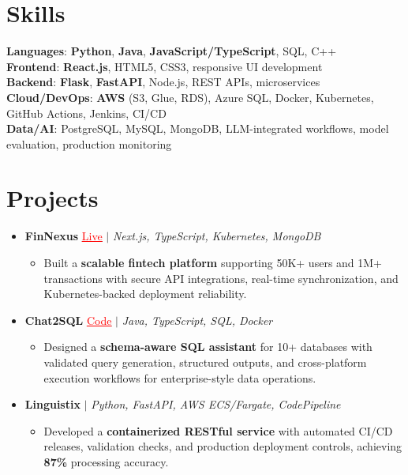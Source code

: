 \documentclass[letterpaper,10pt]{article}
\newcommand{\resumeItem}[1]{\item\small{{#1 \vspace{-2pt}}}}
\newcommand{\resumeProjectHeading}[1]{\item \small #1 \vspace{-1pt}}
\newcommand{\resumeSubHeadingListStart}{\begin{itemize}[leftmargin=0.0in, label={}]}
\newcommand{\resumeSubHeadingListEnd}{\end{itemize}}
\newcommand{\resumeProjItemListStart}{\begin{itemize}[leftmargin=0.15in,label=\textbullet,itemsep=0pt,topsep=0pt,parsep=0pt,partopsep=0pt]}
\newcommand{\resumeProjItemListEnd}{\end{itemize}\vspace{-6pt}}
\begin{document}
\section{Skills}
\begin{itemize}[leftmargin=0.15in, label={}]
\small{\item{
\textbf{Languages}: \textbf{Python}, \textbf{Java}, \textbf{JavaScript/TypeScript}, SQL, C++ \\
\textbf{Frontend}: \textbf{React.js}, HTML5, CSS3, responsive UI development \\
\textbf{Backend}: \textbf{Flask}, \textbf{FastAPI}, Node.js, REST APIs, microservices \\
\textbf{Cloud/DevOps}: \textbf{AWS} (S3, Glue, RDS), Azure SQL, Docker, Kubernetes, GitHub Actions, Jenkins, CI/CD \\
\textbf{Data/AI}: PostgreSQL, MySQL, MongoDB, LLM-integrated workflows, model evaluation, production monitoring
}}
\end{itemize}
\vspace{-15pt}
\section{Projects}
\resumeSubHeadingListStart
\vspace{-3pt}
\resumeProjectHeading{\textbf{FinNexus} {\href{https://fin-nexus.vercel.app/}{\textcolor{red}{\underline{Live}}}} $|$ \emph{Next.js, TypeScript, Kubernetes, MongoDB}}
\resumeProjItemListStart
\resumeItem{Built a \textbf{scalable fintech platform} supporting 50K+ users and 1M+ transactions with secure API integrations, real-time synchronization, and Kubernetes-backed deployment reliability.}
\resumeProjItemListEnd
\resumeProjectHeading{\textbf{Chat2SQL} {\href{https://github.com/SAHAJ-BHADJA/Chat2SQL}{\textcolor{red}{\underline{Code}}}} $|$ \emph{Java, TypeScript, SQL, Docker}}
\resumeProjItemListStart
\resumeItem{Designed a \textbf{schema-aware SQL assistant} for 10+ databases with validated query generation, structured outputs, and cross-platform execution workflows for enterprise-style data operations.}
\resumeProjItemListEnd
\resumeProjectHeading{\textbf{Linguistix} $|$ \emph{Python, FastAPI, AWS ECS/Fargate, CodePipeline}}
\resumeProjItemListStart
\resumeItem{Developed a \textbf{containerized RESTful service} with automated CI/CD releases, validation checks, and production deployment controls, achieving \textbf{87\%} processing accuracy.}
\resumeProjItemListEnd
\resumeSubHeadingListEnd
\end{document}
